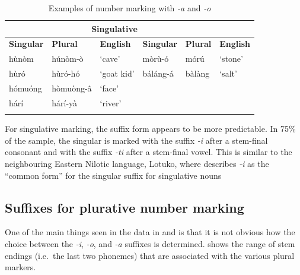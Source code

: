 \documentclass[output=paper]{langsci/langscibook}
\begin{document}
\begin{table}
\begin{tabularx}{\textwidth}{XlXXXX}
\lsptoprule

\multicolumn{3}{c}{ \textbf{Plural}} & \multicolumn{3}{c}{ \textbf{Singulative}}\\ \midrule
 \textbf{Singular} & \textbf{Plural} & \textbf{English} & \textbf{Singular} & \textbf{Plural} & \textbf{English}\\ \midrule
 h\`{u}n\`{o}m &  h\'{u}n\`{o}m-\`{o} & ‘cave’ &  m\`{o}r\`{u}-\'{o} &  m\'{o}r\'{u} & ‘stone’\\
 h\`{u}r\'{o} &  h\`{u}r\'{o}-h\'{o} & ‘goat kid’ &  b\'{a}l\'{a}ng-\'{a} &  b\`{a}l\`{a}ng & ‘salt’\\
 h\'{o}mu\'{o}ng &  h\`{o}mu\`{o}ng-\^{a} & ‘face’ &  &  & \\
 h\'{a}r\'{i} &  h\'{a}r\'{i}-y\`{a} & ‘river’ &  &  & \\
\lspbottomrule
\end{tabularx}
\caption{Examples of number marking with \textit{-a} and \textit{-o}} 
\label{tab:moodie:11}
\end{table}

For singulative marking, the suffix form appears to be more predictable.  In 75\% of the sample, the singular is marked with the suffix \textit{-i} after a stem-final consonant and with the suffix \textit{-ti} after a stem-final vowel. This is similar to the neighbouring Eastern Nilotic language, Lotuko, where \citet[7]{Arber1936} describes \textit{-i} as the “common form” for the singular suffix for singulative nouns 

\subsection{Suffixes for plurative number marking}\label{sec:moodie:4.2} 

One of the main things seen in the data in  and  is that it is not obvious how the choice between the \textit{{}-i}, \textit{-o}, and \textit{{}-a} suffixes is determined.  shows the range of stem endings (i.e.\ the last two phonemes) that are associated with the various plural markers.
\end{document}

